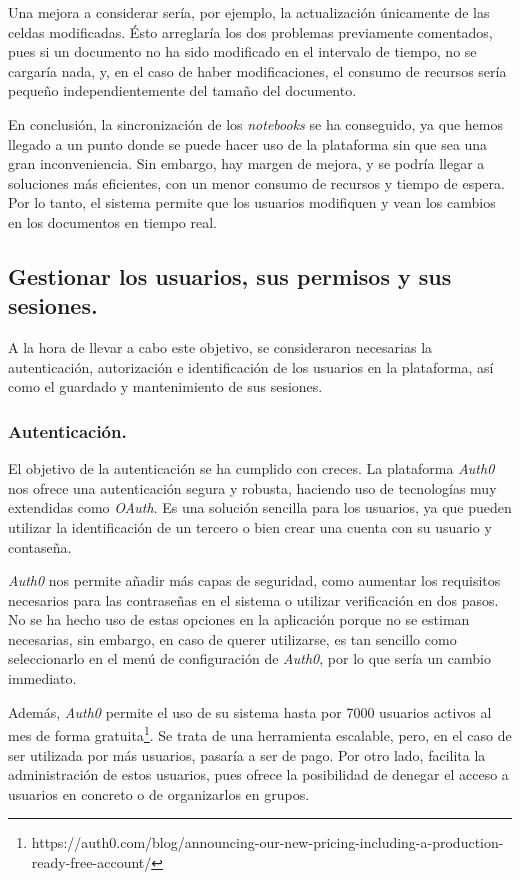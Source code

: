 \documentclass[11pt,spanish,listoffigures]{tfgetsinf}
\begin{document}
Una mejora a considerar sería, por ejemplo, la actualización únicamente de las celdas modificadas. Ésto arreglaría los dos problemas previamente comentados, pues si un documento no ha sido modificado en el intervalo de tiempo, no se cargaría nada, y, en el caso de haber modificaciones, el consumo de recursos sería pequeño independientemente del tamaño del documento. 

En conclusión, la sincronización de los \textit{notebooks} se ha conseguido, ya que hemos llegado a un punto donde se puede hacer uso de la plataforma sin que sea una gran inconveniencia. Sin embargo, hay margen de mejora, y se podría llegar a soluciones más eficientes, con un menor consumo de recursos y tiempo de espera. Por lo tanto, el sistema permite que los usuarios modifiquen y vean los cambios en los documentos en tiempo real.

\subsection{Gestionar los usuarios, sus permisos y sus sesiones.}
\label{subsec:objetivos-conc-roles}

A la hora de llevar a cabo este objetivo, se consideraron necesarias la autenticación, autorización e identificación de los usuarios en la plataforma, así como el guardado y mantenimiento de sus sesiones.

\subsubsection{Autenticación.}
\label{subsec:objetivos-conc-auth}

El objetivo de la autenticación se ha cumplido con creces. La plataforma \textit{Auth0} nos ofrece una autenticación segura y robusta, haciendo uso de tecnologías muy extendidas como \textit{OAuth}. Es una solución sencilla para los usuarios, ya que pueden utilizar la identificación de un tercero o bien crear una cuenta con su usuario y contaseña. 

\textit{Auth0} nos permite añadir más capas de seguridad, como aumentar los requisitos necesarios para las contraseñas en el sistema o utilizar verificación en dos pasos. No se ha hecho uso de estas opciones en la aplicación porque no se estiman necesarias, sin embargo, en caso de querer utilizarse, es tan sencillo como seleccionarlo en el menú de configuración de \textit{Auth0}, por lo que sería un cambio immediato.

Además, \textit{Auth0} permite el uso de su sistema hasta por 7000 usuarios activos al mes de forma gratuita\footnote{https://auth0.com/blog/announcing-our-new-pricing-including-a-production-ready-free-account/}. Se trata de una herramienta escalable, pero, en el caso de ser utilizada por más usuarios, pasaría a ser de pago. Por otro lado, facilita la administración de estos usuarios, pues ofrece la posibilidad de denegar el acceso a usuarios en concreto o de organizarlos en grupos.
\end{document}
